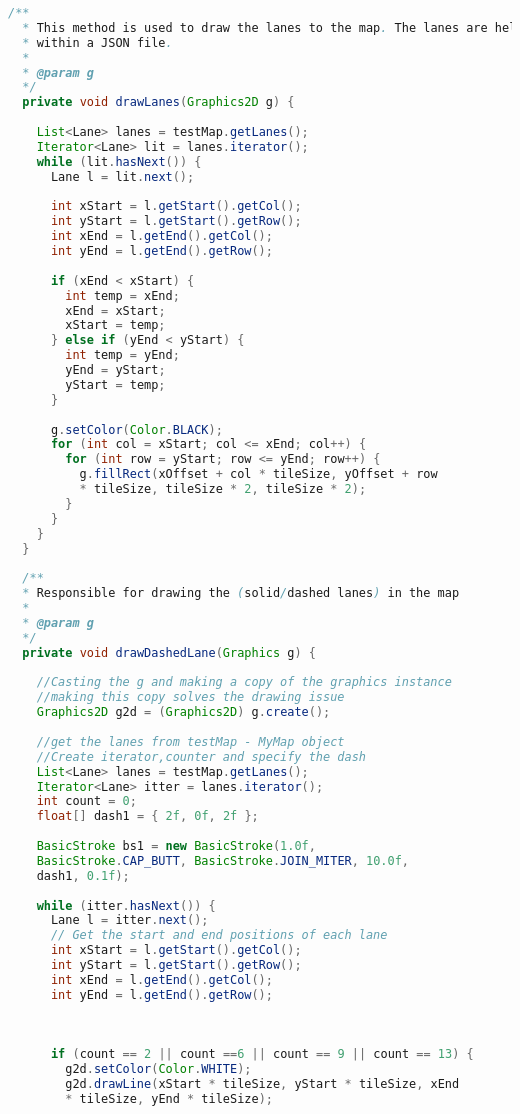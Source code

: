\begin{lstlisting}[language=java]
  /**
  * This method is used to draw the lanes to the map. The lanes are held
  * within a JSON file.
  * 
  * @param g
  */
  private void drawLanes(Graphics2D g) {
    
    List<Lane> lanes = testMap.getLanes();
    Iterator<Lane> lit = lanes.iterator();
    while (lit.hasNext()) {
      Lane l = lit.next();
      
      int xStart = l.getStart().getCol();
      int yStart = l.getStart().getRow();
      int xEnd = l.getEnd().getCol();
      int yEnd = l.getEnd().getRow();
      
      if (xEnd < xStart) {
        int temp = xEnd;
        xEnd = xStart;
        xStart = temp;
      } else if (yEnd < yStart) {
        int temp = yEnd;
        yEnd = yStart;
        yStart = temp;
      }
      
      g.setColor(Color.BLACK);
      for (int col = xStart; col <= xEnd; col++) {
        for (int row = yStart; row <= yEnd; row++) {
          g.fillRect(xOffset + col * tileSize, yOffset + row
          * tileSize, tileSize * 2, tileSize * 2);
        }
      }
    }
  }
  
  /**
  * Responsible for drawing the (solid/dashed lanes) in the map
  * 
  * @param g
  */
  private void drawDashedLane(Graphics g) {
    
    //Casting the g and making a copy of the graphics instance 
    //making this copy solves the drawing issue
    Graphics2D g2d = (Graphics2D) g.create(); 
    
    //get the lanes from testMap - MyMap object
    //Create iterator,counter and specify the dash 
    List<Lane> lanes = testMap.getLanes();
    Iterator<Lane> itter = lanes.iterator();
    int count = 0;
    float[] dash1 = { 2f, 0f, 2f };
    
    BasicStroke bs1 = new BasicStroke(1.0f,
    BasicStroke.CAP_BUTT, BasicStroke.JOIN_MITER, 10.0f,
    dash1, 0.1f);
    
    while (itter.hasNext()) {
      Lane l = itter.next();
      // Get the start and end positions of each lane
      int xStart = l.getStart().getCol();
      int yStart = l.getStart().getRow();
      int xEnd = l.getEnd().getCol();
      int yEnd = l.getEnd().getRow();
      
      
      
      if (count == 2 || count ==6 || count == 9 || count == 13) {
        g2d.setColor(Color.WHITE);
        g2d.drawLine(xStart * tileSize, yStart * tileSize, xEnd
        * tileSize, yEnd * tileSize);
        

\end{lstlisting}
